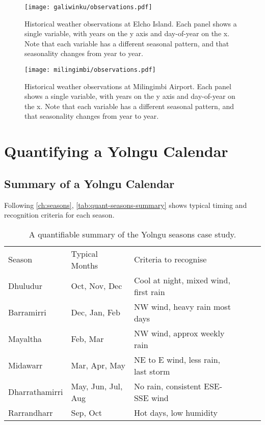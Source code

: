 \begin{figure}[p]
    \centering
    \texttt{[image: galiwinku/observations.pdf]}
    \caption[Historical weather observations at Elcho Island]{
        Historical weather observations at Elcho Island.
        Each panel shows a single variable, with years on the y axis and day-of-year on the x.
        Note that each variable has a different seasonal pattern,
        and that seasonality changes from year to year.}
    \label{fig:galiwinku-observations}
\end{figure}
\begin{figure}[p]
    \centering
    \texttt{[image: milingimbi/observations.pdf]}
    \caption[Historical weather observations at Milingimbi Airport]{
        Historical weather observations at Milingimbi Airport.
        Each panel shows a single variable, with years on the y axis and day-of-year on the x.
        Note that each variable has a different seasonal pattern,
        and that seasonality changes from year to year.}
    \label{fig:milingimbi-observations}
\end{figure}




\section{Quantifying a Yolngu Calendar}

\subsection{Summary of a Yolngu Calendar}
Following \autoref{ch:seasons}, \autoref{tab:quant-seasons-summary} shows
typical timing and recognition criteria for each season.


\begin{table}[h]
    \centering
    \begin{tabular}{llllll}
        Season          &  Typical Months       &  Criteria to recognise                    \\
        Dhuludur        &  Oct, Nov, Dec        &  Cool at night, mixed wind, first rain    \\
        Barramirri      &  Dec, Jan, Feb        &  NW wind, heavy rain most days            \\
        Mayaltha        &  Feb, Mar             &  NW wind, approx weekly rain              \\
        Midawarr        &  Mar, Apr, May        &  NE to E wind, less rain, last storm      \\
        Dharrathamirri  &  May, Jun, Jul, Aug   &  No rain, consistent ESE-SSE wind         \\
        Rarrandharr     &  Sep, Oct             &  Hot days, low humidity                   
    \end{tabular}
    \caption[A quantifiable summary of the Yolngu seasons case study]{
        A quantifiable summary of the Yolngu seasons case study.}
    \label{tab:quant-seasons-summary}
\end{table}


